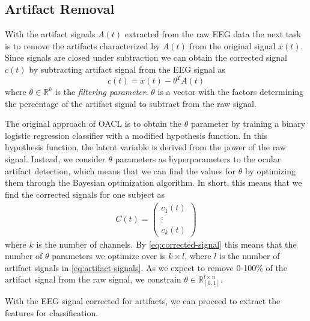 \subsection{Artifact Removal}
With the artifact signals $A(t)$ extracted from the raw EEG data the next task is to remove the artifacts characterized by $A(t)$ from the original signal $x(t)$. Since signals are closed under subtraction we can obtain the corrected signal $c(t)$ by subtracting artifact signal from the EEG signal as
\begin{equation}\label{eq:corrected-signal}
c(t) = x(t) - \theta^T A(t)
\end{equation}
where $\theta \in \mathbb{R}^{k}$ is the \emph{filtering parameter}. $\theta$ is a vector with the factors determining the percentage of the artifact signal to subtract from the raw signal. 

The original approach of OACL is to obtain the $\theta$ parameter by training a binary logistic regression classifier with a modified hypothesis function. In this hypothesis function, the latent variable is derived from the power of the raw signal. Instead, we consider $\theta$ parameters as hyperparameters to the ocular artifact detection, which means that we can find the values for $\theta$ by optimizing them through the Bayesian optimization algorithm. In short, this means that we find the corrected signals for one subject as
\begin{align}\label{eq:corrected-signal}
C(t)=  \begin{pmatrix}
c_1(t) \\
\vdots  \\
c_{k}(t) 
\end{pmatrix}
\end{align}
where $k$ is the number of channels. By \cref{eq:corrected-signal} this means that the number of $\theta$ parameters we optimize over is $k \times l$, where $l$ is the number of artifact signals in \cref{eq:artifact-signals}. As we expect to remove 0-100\% of the artifact signal from the raw signal, we constrain $\theta \in \mathbb{R}^{l\times n}_{[0,1]}$.

With the EEG signal corrected for artifacts, we can proceed to extract the features for classification.